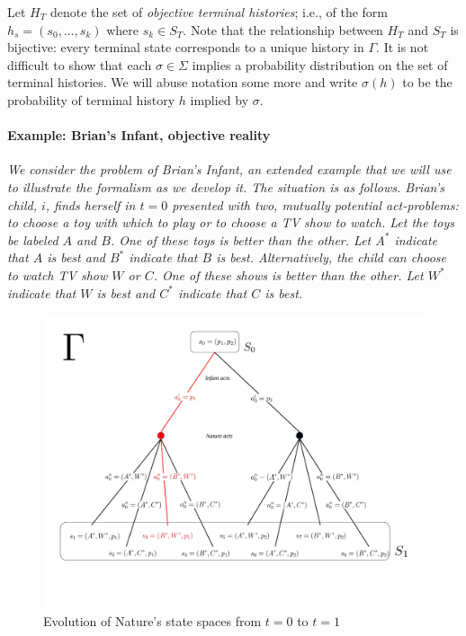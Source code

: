 \documentclass[
11pt,
titlepage,
reqno,
]{article}%
\theoremstyle{definition}
\begin{document}
Let $H_T$ denote the set of  \textit{objective terminal histories}; i.e., of the form $h_s=(s_0,\ldots,s_k)$ where $s_k\in S_T$.
Note that the relationship between $H_T$ and $S_T$ is bijective: every terminal state corresponds to a unique history in $\Gamma$.
It is not difficult to show that each $\sigma\in\Sigma$ implies a probability distribution on the set of terminal histories.
We will abuse notation some more and write $\sigma(h)$ to be the probability of terminal history $h$ implied by $\sigma$.
		
\paragraph{Example: Brian's Infant, objective reality}
{\em	
We consider the problem of Brian's Infant, an extended example that we will use  to illustrate the formalism as we develop it.
The situation is as follows.
Brian's child, $i$, finds herself in $t=0$ presented with two, mutually potential act-problems: to choose a toy with which to play or to choose a TV show to watch. 
Let the toys be labeled $A$ and $B$. 
One of these toys is better than the other. 
Let $A^\ast$ indicate that $A$ is best and $B^\ast$ indicate that $B$ is best. 
Alternatively, the child can choose to watch TV show $W$ or $C$.
One of these shows is better than the other. 
Let $W^\ast$ indicate that $W$ is best and $C^\ast$ indicate that $C$ is best.


\begin{figure}[h!]
	\centering
	\includegraphics*[page=1,trim = 0in 1in 0in 0in,scale=.6]{Awareness_Diagrams_All}
	\caption{Evolution of Nature's state spaces from $t=0$ to $t=1$\label{Diag: p-01}}%
\end{figure}

}
\end{document}
